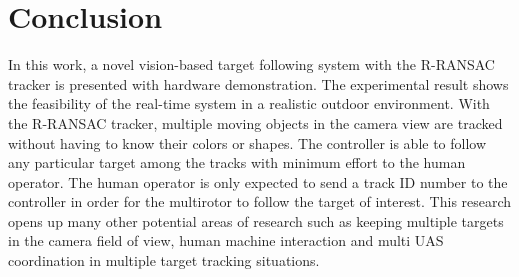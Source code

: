 \documentclass[letterpaper, 10 pt, conference]{ieeeconf}  %
\begin{document}
\section{Conclusion}
In this work, a novel vision-based target following system with the R-RANSAC tracker is presented with hardware demonstration. The experimental result shows the feasibility of the real-time system in a realistic outdoor environment. With the R-RANSAC tracker, multiple moving objects in the camera view are tracked without having to know their colors or shapes. The controller is able to follow any particular target among the tracks with minimum effort to the human operator. The human operator is only expected to send a track ID number to the controller in order for the multirotor to follow the target of interest. This research opens up many other potential areas of research such as keeping multiple targets in the camera field of view, human machine interaction and multi UAS coordination in multiple target tracking situations.



		



\end{document}
